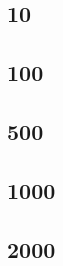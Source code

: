 \documentclass{article}
\begin{document}
\subsection{10}
\subsection{100}
\subsection{500}
\subsection{1000}
\subsection{2000}




\end{document}
